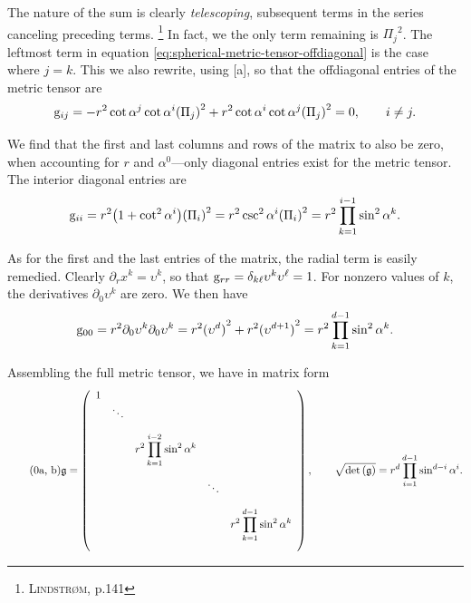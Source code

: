 \noindent
The nature of the sum is clearly \emph{telescoping}, subsequent terms in the series canceling preceding terms.%
\footnote{%
  \cite{lindstrom2017spaces} \textsc{Lindstrøm}, p.141
}
In fact, we the only term remaining is ${\Pi_j}^2$.
The leftmost term in equation \eqref{eq:spherical-metric-tensor-offdiagonal} is the case where $j = k$.
This we also rewrite, using \subeqref{\ref{eq:spherical-coordinates-product}}[a], so that the offdiagonal entries of the metric tensor are
%
\[
  \mathrm{g}_{ij} = -r^2 \cot{\alpha^j} \cot{\alpha^i} {(\Pi_j)}^2 + r^2 \cot{\alpha^i} \cot{\alpha^j} {(\Pi_j)}^2 = 0, \qquad i \neq j.
\]

\noindent
We find that the first and last columns and rows of the matrix to also be zero, when accounting for $r$ and $\alpha^0$---only diagonal entries exist for the metric tensor.
The interior diagonal entries are
%
\begin{equation}
  \mathrm{g}_{ii} = r^2 \big( 1 + \cot^2{\alpha^i} \big) {(\Pi_i)}^2 = r^2 \csc^2{\alpha^i} {(\Pi_i)}^2 = r^2 \prod_{k = 1}^{i-1} \sin^2{\alpha^k}.
\end{equation}

\noindent
As for the first and the last entries of the matrix, the radial term is easily remedied.
Clearly $\partial_r x^k = \upsilon^k$, so that $\mathrm{g}_{rr} = \delta_{k\ell} \upsilon^k \upsilon^\ell = 1$.
For nonzero values of $k$, the derivatives $\partial_0 \upsilon^k$ are zero.
We then have
%
\begin{equation}
  \mathrm{g}_{00} = r^2 \partial_0 \upsilon^k \partial_0 \upsilon^k = r^2 {(\upsilon^{d})}^2 + r^2 {(\upsilon^{d+1})}^2 = r^2 \prod_{k = 1}^{d - 1} \sin^2{\alpha^k}.
\end{equation}

\noindent
Assembling the full metric tensor, we have in matrix form
%
\begin{subequations}\label{eq:hyperspherical-metric-tensor}
  \begin{equation}\tag{\theequation{a, b}}
    \metrictensor = \begin{pmatrix}
      \hspace{.5em}
      1 &  &  &  & \\\vspace{1em}
      & \ddots &  &  & \\\vspace{1em}
      &  & \displaystyle{r^2 \prod_{k = 1}^{i-2} \sin^2{\alpha^k}} &  & \\\vspace{1em}
      &  &  & \ddots & \\\vspace{1em}
      &  &  &  & \displaystyle{r^2 \prod_{k = 1}^{d-1} \sin^2{\alpha^k}}
      \hspace{.5em}
    \end{pmatrix},
    \qquad \sqrt{\det{(\metrictensor)}} = r^{d} \prod_{i = 1}^{d-1} \sin^{d-i}{\alpha^i}.
  \end{equation}
\end{subequations}

